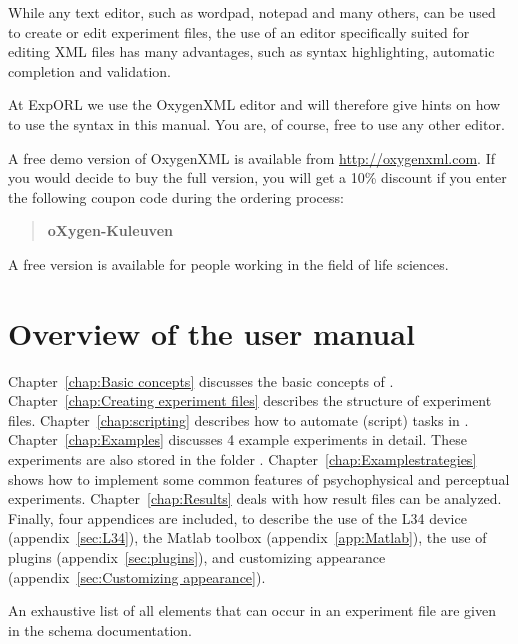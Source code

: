 While any text editor, such as wordpad, notepad and many others,
can be used to create or edit experiment files, the use of an
editor specifically suited for editing XML files has many
advantages, such as syntax highlighting, automatic completion and
validation.

At ExpORL we use the OxygenXML editor and will therefore give
hints on how to use the syntax in this manual. You are, of course,
free to use any other editor.

A free demo version of OxygenXML is available from
\url{http://oxygenxml.com}. If you would decide to buy the full
version, you will get a 10\% discount if you enter the following
coupon code during the ordering process:
\begin{quote}
    \textbf{oXygen-Kuleuven}
\end{quote}
\label{sec:XML editor}

A free version is available for people working in the field of
life sciences.

\section{Overview of the \apex user manual}

Chapter~\ref{chap:Basic concepts} discusses the basic concepts of
\apex. Chapter~\ref{chap:Creating experiment files} describes the
structure of experiment files. Chapter~\ref{chap:scripting} describes how to automate (script) tasks in \apex. Chapter~\ref{chap:Examples}
discusses 4 example experiments in detail. These experiments are
also stored in the folder .
Chapter~\ref{chap:Examplestrategies} shows how to implement some
common features of psychophysical and perceptual experiments.
Chapter~\ref{chap:Results} deals with how \apex result files can
be analyzed. Finally, four appendices are included, to describe
the use of the L34 device (appendix~\ref{sec:L34}), the Matlab
toolbox (appendix~\ref{app:Matlab}), the use of plugins
(appendix~\ref{sec:plugins}), and customizing appearance
(appendix~\ref{sec:Customizing appearance}).

An exhaustive list of all elements that can occur in an \apex
experiment file are given in the schema documentation.
